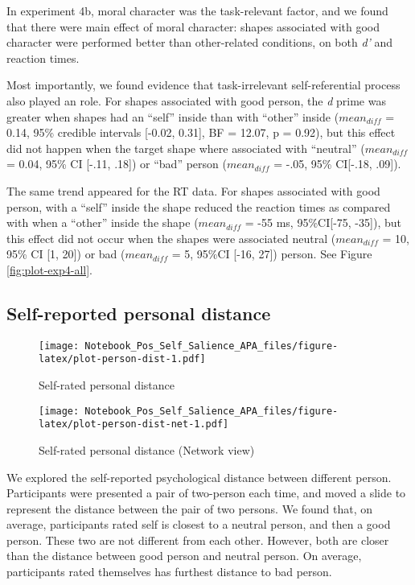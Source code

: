 \documentclass[
  man]{apa6}
\begin{document}
In experiment 4b, moral character was the task-relevant factor, and we found that there were main effect of moral character: shapes associated with good character were performed better than other-related conditions, on both \emph{d'} and reaction times.

Most importantly, we found evidence that task-irrelevant self-referential process also played an role. For shapes associated with good person, the \emph{d} prime was greater when shapes had an ``self'' inside than with ``other'' inside (\(mean_{diff}\) = 0.14, 95\% credible intervals {[}-0.02, 0.31{]}, BF = 12.07, p = 0.92), but this effect did not happen when the target shape where associated with ``neutral'' (\(mean_{diff}\) = 0.04, 95\% CI {[}-.11, .18{]}) or ``bad'' person (\(mean_{diff}\) = -.05, 95\% CI{[}-.18, .09{]}).

The same trend appeared for the RT data. For shapes associated with good person, with a ``self'' inside the shape reduced the reaction times as compared with when a ``other'' inside the shape (\(mean_{diff}\) = -55 ms, 95\%CI{[}-75, -35{]}), but this effect did not occur when the shapes were associated neutral (\(mean_{diff}\) = 10, 95\% CI {[}1, 20{]}) or bad (\(mean_{diff}\) = 5, 95\%CI {[}-16, 27{]}) person. See Figure \ref{fig:plot-exp4-all}.

\hypertarget{self-reported-personal-distance}{%
\subsection{Self-reported personal distance}\label{self-reported-personal-distance}}

\begin{figure}
\centering
\texttt{[image: Notebook\_Pos\_Self\_Salience\_APA\_files/figure-latex/plot-person-dist-1.pdf]}
\caption{\label{fig:plot-person-dist}Self-rated personal distance}
\end{figure}

\begin{figure}
\centering
\texttt{[image: Notebook\_Pos\_Self\_Salience\_APA\_files/figure-latex/plot-person-dist-net-1.pdf]}
\caption{\label{fig:plot-person-dist-net}Self-rated personal distance (Network view)}
\end{figure}

We explored the self-reported psychological distance between different person. Participants were presented a pair of two-person each time, and moved a slide to represent the distance between the pair of two persons. We found that, on average, participants rated self is closest to a neutral person, and then a good person. These two are not different from each other. However, both are closer than the distance between good person and neutral person. On average, participants rated themselves has furthest distance to bad person.
\end{document}
